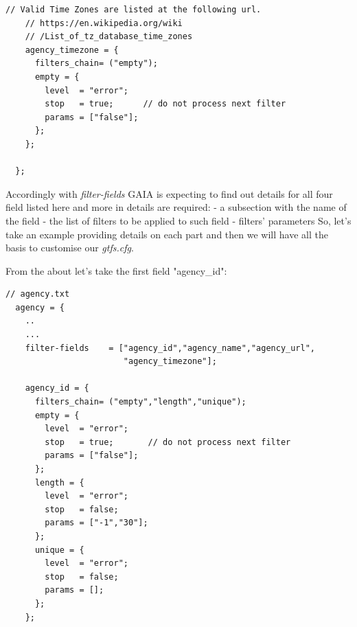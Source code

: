 \documentclass[12pt, a4paper]{book}
\begin{document}
\begin{justify}
\begin{small}
\begin{lstlisting}[backgroundcolor=\color{gray},frame=single]
    // Valid Time Zones are listed at the following url.
    // https://en.wikipedia.org/wiki
    // /List_of_tz_database_time_zones
    agency_timezone = {
      filters_chain= ("empty");
      empty = {
        level  = "error";
        stop   = true;      // do not process next filter
        params = ["false"];
      };
    };

  };
\end{lstlisting}
\end{small}

\newpage
Accordingly with \textit{filter-fields} GAIA is expecting to find out details for all four field listed here and more in details are required:
- a subsection with the name of the field
- the list of filters to be applied to such field
- filters' parameters
So, let's take an example providing details on each part and then we will have all the basis to customise our \textit{gtfs.cfg}.\newline

From the about let's take the first field "agency\_id":

\begin{small}
\begin{lstlisting}[backgroundcolor=\color{gray},frame=single]
 // agency.txt
  agency = {
    ..
    ...
    filter-fields    = ["agency_id","agency_name","agency_url",
                        "agency_timezone"];    
    
    agency_id = {
      filters_chain= ("empty","length","unique");
      empty = {
        level  = "error";
        stop   = true;       // do not process next filter
        params = ["false"];
      };
      length = {
        level  = "error";
        stop   = false;
        params = ["-1","30"];
      };
      unique = {
        level  = "error";
        stop   = false;
        params = [];
      };
    };
\end{lstlisting}
\end{small}


\end{justify}
\end{document}
